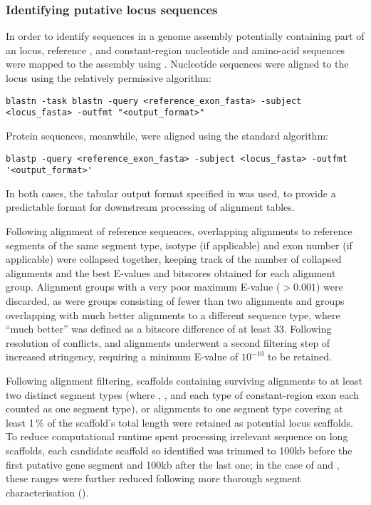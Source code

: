 \subsubsection{Identifying putative locus sequences}
\label{sec:methods_comp_locus_scaffolds}

In order to identify sequences in a genome assembly potentially containing part of an \igh{} locus, reference \vh, \jh and constant-region nucleotide and amino-acid sequences were mapped to the assembly using  \parencite{altschul1990blast,altschul1997blast}. Nucleotide sequences were aligned to the locus using the relatively permissive  algorithm:

\begin{lstlisting}
blastn -task blastn -query <reference_exon_fasta> -subject <locus_fasta> -outfmt "<output_format>"
\end{lstlisting}

\noindent Protein sequences, meanwhile, were aligned using the standard  algorithm:

\begin{lstlisting}
blastp -query <reference_exon_fasta> -subject <locus_fasta> -outfmt '<output_format>'
\end{lstlisting}

\noindent In both cases, the tabular output format specified in  was used, to provide a predictable format for downstream processing of  alignment tables.

Following alignment of reference sequences, overlapping alignments to reference segments of the same segment type, isotype (if applicable) and exon number (if applicable) were collapsed together, keeping track of the number of collapsed alignments and the best E-values and bitscores obtained for each alignment group. Alignment groups with a very poor maximum E-value ($> 0.001$) were discarded, as were groups consisting of fewer than two alignments and groups overlapping with much better alignments to a different sequence type, where ``much better'' was defined as a bitscore difference of at least 33. Following resolution of conflicts, \vh and \ch alignments underwent a second filtering step of increased stringency, requiring a minimum E-value of $10^{-10}$ to be retained. 

Following alignment filtering, scaffolds containing surviving alignments to at least two distinct segment types (where \vh, \jh, and each type of constant-region exon each counted as one segment type), or alignments to one segment type covering at least 1\,\% of the scaffold's total length were retained as potential locus scaffolds. To reduce computational runtime spent processing irrelevant sequence on long scaffolds, each candidate scaffold so identified was trimmed to 100kb before the first putative gene segment and 100kb after the last one; in the case of \nfu and \xma, these ranges were further reduced following more thorough segment characterisation ().

